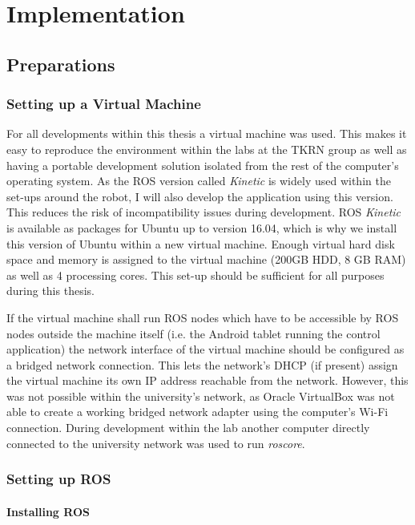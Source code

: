 \chapter{Implementation}
\label{chap:implementation}
\section{Preparations}
\subsection{Setting up a Virtual Machine}

For all developments within this thesis a virtual machine was used. This makes it easy to reproduce the environment within the labs at the TKRN group as well as having a portable development solution isolated from the rest of the computer's operating system. As the ROS version called \textit{Kinetic} is widely used within the set-ups around the robot, I will also develop the application using this version. This reduces the risk of incompatibility issues during development. ROS \textit{Kinetic} is available as packages for Ubuntu up to version 16.04\cite{ros:install}, which is why we install this version of Ubuntu within a new virtual machine. Enough virtual hard disk space and memory is assigned to the virtual machine (200GB HDD, 8 GB RAM) as well as 4 processing cores. This set-up should be sufficient for all purposes during this thesis. 

If the virtual machine shall run ROS nodes which have to be accessible by ROS nodes outside the machine itself (i.e. the Android tablet running the control application) the network interface of the virtual machine should be configured as a bridged network connection. This lets the network's DHCP (if present) assign the virtual machine its own IP address reachable from the network. However, this was not possible within the university's network, as Oracle VirtualBox was not able to create a working bridged network adapter using the computer's Wi-Fi connection. During development within the lab another computer directly connected to the university network was used to run \textit{roscore}.

\subsection{Setting up ROS}

\subsubsection{Installing ROS}

